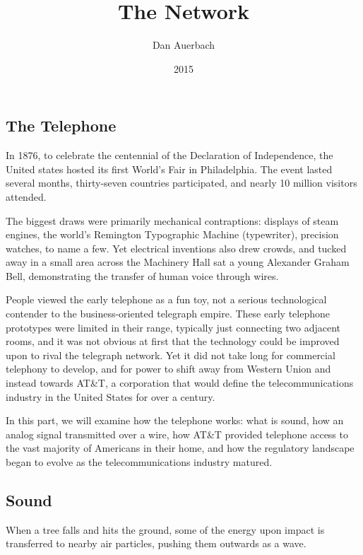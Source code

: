 \documentclass[UTF8]{book}
\begin{document}
\begin{CJK}{UTF8}{gbsn}

\title{The Network}
\author{Dan Auerbach}
\date{2015}
\maketitle

\part{The Telephone}

In 1876, to celebrate the centennial of the Declaration of Independence, the United states hosted its first World's Fair in Philadelphia. The event lasted several months, thirty-seven countries participated, and nearly 10 million visitors attended.

The biggest draws were primarily mechanical contraptions: displays of steam engines, the world's Remington Typographic Machine (typewriter), precision watches, to name a few. Yet electrical inventions also drew crowds, and tucked away in a small area across the Machinery Hall sat a young Alexander Graham Bell, demonstrating the transfer of human voice through wires.

People viewed the early telephone as a fun toy, not a serious technological contender to the business-oriented telegraph empire. These early telephone prototypes were limited in their range, typically just connecting two adjacent rooms, and it was not obvious at first that the technology could be improved upon to rival the telegraph network. Yet it did not take long for commercial telephony to develop, and for power to shift away from Western Union and instead towards AT&T, a corporation that would define the telecommunications industry in the United States for over a century.

In this part, we will examine how the telephone works: what is sound, how an analog signal transmitted over a wire, how AT&T provided telephone access to the vast majority of Americans in their home, and how the regulatory landscape began to evolve as the telecommunications industry matured.

\chapter{Sound}

When a tree falls and hits the ground, some of the energy upon impact is transferred to nearby air particles, pushing them outwards as a wave.


\end{CJK}
\end{document}
